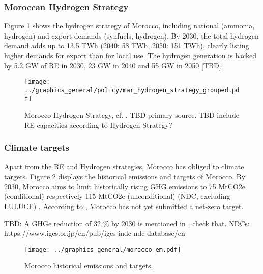 \subsubsection{Moroccan Hydrogen Strategy}
Figure \ref{fig:mar_hydrogen_strategy} shows the hydrogen strategy of Morocco, including
national (ammonia, hydrogen) and export demands (synfuels, hydrogen).
By 2030, the total hydrogen demand adds up to 13.5 TWh (2040: 58 TWh, 2050: 151 TWh), 
clearly listing higher demands for export than for local use. The hydrogen generation is backed by 5.2 GW of RE in 2030, 23 GW in 2040 and 55 GW in 2050 [TBD].


\begin{figure}
    \centering
    \texttt{[image: ../graphics\_general/policy/mar\_hydrogen\_strategy\_grouped.pdf]}
    \caption{Morocco Hydrogen Strategy, cf. \cite[p. 14]{Ersoy2022}. TBD primary source. TBD include RE capacities according to Hydrogen Strategy?}
    \label{fig:mar_hydrogen_strategy}
\end{figure}

\subsubsection{Climate targets}
Apart from the RE and Hydrogen strategies, Morocco has obliged to climate targets.
Figure \ref{fig:morocco_em} displays the historical emissions and targets of Morocco.
By 2030, Morocco aims to limit historically rising GHG emissions to 75 MtCO2e (conditional) 
respectively 115 MtCO2e (unconditional) (NDC, excluding LULUCF) \cite{CAT2021}. 
According to \cite{CAT2021}, Morocco has not yet submitted a net-zero target.

TBD: A GHGe reduction of 32 \% by 2030 is mentioned in \cite[5]{Boulakhbar2020}, check that.
NDCs: https://www.iges.or.jp/en/pub/iges-indc-ndc-database/en 


\begin{figure}[h!]
    \centering
    \texttt{[image: ../graphics\_general/morocco\_em.pdf]}
    \caption{Morocco historical emissions and targets.}
    \label{fig:morocco_em}
\end{figure}